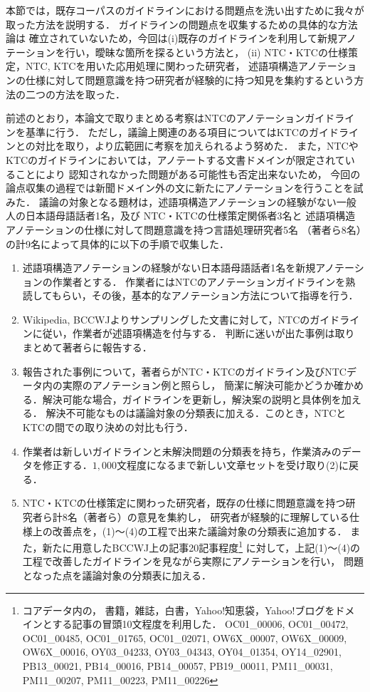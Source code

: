 \documentclass[japanese]{jnlp_1.4}
\begin{document}
本節では，既存コーパスのガイドラインにおける問題点を洗い出すために我々が取った方法を説明する．
ガイドラインの問題点を収集するための具体的な方法論は
確立されていないため，今回は(i)既存のガイドラインを利用して新規アノテーションを行い，曖昧な箇所を探るという方法と，
(ii) NTC・KTCの仕様策定，NTC, KTCを用いた応用処理に関わった研究者，
述語項構造アノテーションの仕様に対して問題意識を持つ研究者が経験的に持つ知見を集約するという方法の二つの方法を取った．

前述のとおり，本論文で取りまとめる考察はNTCのアノテーションガイドラインを基準に行う．
ただし，議論上関連のある項目についてはKTCのガイドラインとの対比を取り，より広範囲に考察を加えられるよう努めた．
また，NTCやKTCのガイドラインにおいては，アノテートする文書ドメインが限定されていることにより
認知されなかった問題がある可能性も否定出来ないため，
今回の論点収集の過程では新聞ドメイン外の文に新たにアノテーションを行うことを試みた．
議論の対象となる題材は，述語項構造アノテーションの経験がない一般人の日本語母語話者1名，及び
NTC・KTCの仕様策定関係者3名と
述語項構造アノテーションの仕様に対して問題意識を持つ言語処理研究者5名
（著者ら8名）の計9名によって具体的に以下の手順で収集した．

\begin{enumerate}
\item 述語項構造アノテーションの経験がない日本語母語話者1名を新規アノテーションの作業者とする．
作業者にはNTCのアノテーションガイドラインを熟読してもらい，その後，基本的なアノテーション方法について指導を行う．
\item Wikipedia, BCCWJよりサンプリングした文書に対して，NTCのガイドラインに従い，作業者が述語項構造を付与する．
判断に迷いが出た事例は取りまとめて著者らに報告する．
\item 報告された事例について，著者らがNTC・KTCのガイドライン及びNTCデータ内の実際のアノテーション例と照らし，
簡潔に解決可能かどうか確かめる．解決可能な場合，ガイドラインを更新し，解決案の説明と具体例を加える．
解決不可能なものは議論対象の分類表に加える．このとき，NTCとKTCの間での取り決めの対比も行う．
\item 作業者は新しいガイドラインと未解決問題の分類表を持ち，作業済みのデータを修正する．$1,000$文程度になるまで新しい文章セットを受け取り(2)に戻る．
\item NTC・KTCの仕様策定に関わった研究者，既存の仕様に問題意識を持つ研究者ら計8名（著者ら）の意見を集約し，
研究者が経験的に理解している仕様上の改善点を，(1)〜(4)の工程で出来た議論対象の分類表に追加する．
また，新たに用意したBCCWJ上の記事20記事程度\footnote{コアデータ内の，
書籍，雑誌，白書，Yahoo!知恵袋，Yahoo!ブログをドメインとする記事の冒頭10文程度を利用した．
OC01\_00006, OC01\_00472, OC01\_00485, OC01\_01765, OC01\_02071, OW6X\_00007, OW6X\_00009, OW6X\_00016, OY03\_04233, OY03\_04343, OY04\_01354, OY14\_02901, PB13\_00021, PB14\_00016, PB14\_00057, PB19\_00011, PM11\_00031, PM11\_00207,
PM11\_00223, PM11\_00226}
に対して，上記(1)〜(4)の工程で改善したガイドラインを見ながら実際にアノテーションを行い，
問題となった点を議論対象の分類表に加える．
\end{enumerate}
\end{document}
